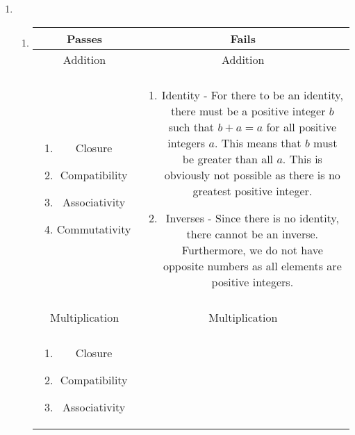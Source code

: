 \documentclass{article}
\begin{document}
\begin{enumerate}[label=\textbf{\arabic*}.]
    \item 
    \begin{enumerate}[label=\textbf{\alph*}.]
        \item 
        \begin{tabular}{c|c}
        \textcolor{pastelGreen}{Passes} & \textcolor{pastelRed}{Fails} \\
        \hline 
        Addition & Addition \\\\
        \begin{minipage}{0.425\textwidth}
            \begin{enumerate}[label=-, itemsep=-3pt]
                \item Closure
                \item Compatibility
                \item Associativity
                \item Commutativity
            \end{enumerate}
        \end{minipage}
        &
        \begin{minipage}{0.425\textwidth}
            \begin{enumerate}[label=-, itemsep=-3pt]
                \item Identity - For there to be an identity, there must be a positive integer $b$ such that $b+a=a$ for all positive integers $a$. This means that $b$ must be greater than all $a$. This is obviously not possible as there is no greatest positive integer.
                \item Inverses - Since there is no identity, there cannot be an inverse. Furthermore, we do not have opposite numbers as all elements are positive integers.
            \end{enumerate}
        \end{minipage} \\\\
        Multiplication & Multiplication \\\\
        \begin{minipage}{0.425\textwidth}
            \begin{enumerate}[label=-, itemsep=-3pt]
                \item Closure
                \item Compatibility
                \item Associativity

\end{enumerate}
\end{minipage}
\end{tabular}
\end{enumerate}
\end{enumerate}
\end{document}
